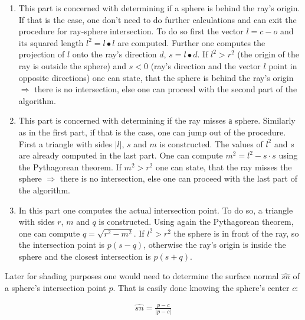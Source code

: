 \documentclass{article}
\begin{document}
\begin{enumerate}[1.]
\item This part is concerned with determining if a sphere is behind the ray's origin. If that is the case, one don't need to do further calculations and can exit the procedure for ray-sphere intersection. To do so first the vector $l = c - o$ and its squared length $l^2 = l \bullet l$ are computed. Further one computes the projection of $l$ onto the ray's direction $d$, $s = l \bullet d$. If $l^2 > r^2$ (the origin of the ray is outside the sphere) and $s < 0$ (ray's direction and the vector $l$ point in opposite directions) one can state, that the sphere is behind the ray's origin $\Rightarrow$ there is no intersection, else one can proceed with the second part of the algorithm.

\item This part is concerned with determining if the ray misses а sphere. Similarly as in the first part, if that is the case, one can jump out of the procedure. First a triangle with sides $\lvert l \rvert$, $s$ and $m$ is constructed. The values of $l^2$ and $s$ are already computed in the last part. One can compute $m^2 = l^2 - s \cdot s$ using the Pythagorean theorem. If $m^2 > r^2$ one can state, that the ray misses the sphere $\Rightarrow$ there is no intersection, else one can proceed with the last part of the algorithm.
	
\item In this part one computes the actual intersection point. To do so, a triangle with sides $r$, $m$ and $q$ is constructed. Using again the Pythagorean theorem, one can compute $q = \sqrt{r^2 - m^2}$. If $l^2 > r^2$ the sphere is in front of the ray, so the intersection point is $p(s-q)$, otherwise the ray's origin is inside the sphere and the closest intersection is $p(s+q)$.
\end{enumerate}

Later for shading purposes one would need to determine the surface normal $\hat{sn}$ of a sphere's intersection point $p$. That is easily done knowing the sphere's center $c$:

\begin{align}
	\hat{sn} = \frac{p - c}{\lvert p - c \rvert}
\end{align}
\end{document}
